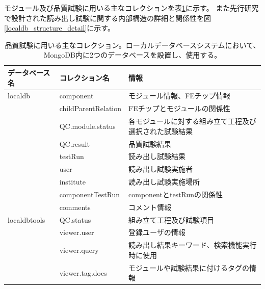 モジュール及び品質試験に用いる主なコレクションを表\ref{localdb_structure}に示す。
また先行研究で設計された読み出し試験に関する内部構造の詳細と関係性を図\ref{localdb_structure_detail}に示す。

\begin{table}[btp]
\begin{center}
\caption[品質試験に用いる主なコレクション]{品質試験に用いる主なコレクション。ローカルデータベースシステムにおいて、MongoDB内に2つのデータベースを設置し、使用する。}
\label{localdb_structure}
  \small
  \begin{tabular}{|lll|} \hline
    データベース名 & コレクション名 & 情報 \\ \hline
    localdb      & component & モジュール情報、FEチップ情報 \\ 
                 & childParentRelation & FEチップとモジュールの関係性 \\ 
                 & QC.module.status & 各モジュールに対する組み立て工程及び選択された試験結果 \\ 
                 & QC.result & 品質試験結果 \\ 
                 & testRun & 読み出し試験結果 \\ 
                 & user & 読み出し試験実施者 \\
                 & institute & 読み出し試験実施場所 \\
                 & componentTestRun & componentとtestRunの関係性 \\
                 & comments & コメント情報 \\ \hline
    localdbtools & QC.status & 組み立て工程及び試験項目\\
                 & viewer.user & 登録ユーザの情報 \\
                 & viewer.query & 読み出し結果キーワード、検索機能実行時に使用 \\ 
                 & viewer.tag.docs & モジュールや試験結果に付けるタグの情報 \\ \hline
  \end{tabular}
\end{center}
\end{table}

